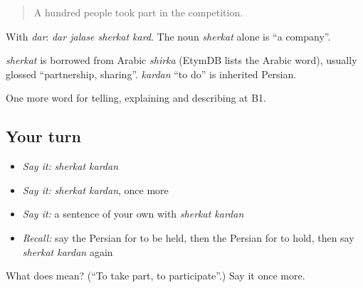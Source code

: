 \begin{quote}
A hundred people took part in the competition.
\end{quote}

With \emph{dar}: \emph{dar jalase sherkat kard}. The noun \emph{sherkat} alone is \textquotedblleft{}a company\textquotedblright{}.

\begin{cousinweb}
\emph{sherkat} is borrowed from Arabic \emph{shirka} (EtymDB lists the Arabic word), usually glossed \textquotedblleft{}partnership, sharing\textquotedblright{}. \emph{kardan} \textquotedblleft{}to do\textquotedblright{} is inherited Persian.
\end{cousinweb}

\begin{grammarlens}[title={What you've built}]
One more word for telling, explaining and describing at B1.
\end{grammarlens}

\subsection*{Your turn}
\begin{itemize}
\raggedright
  \item \emph{Say it:} \emph{sherkat kardan}
  \item \emph{Say it:} \emph{sherkat kardan}, once more
  \item \emph{Say it:} a sentence of your own with \emph{sherkat kardan}
  \item \emph{Recall:} say the Persian for to be held, then the Persian for to hold, then say \emph{sherkat kardan} again
\end{itemize}

\begin{tcolorbox}[breakable,colback=teal!4,colframe=teal!35!black,title={Before you move on}]
What does   mean? (\textquotedblleft{}To take part, to participate\textquotedblright{}.) Say it once more.
\end{tcolorbox}
